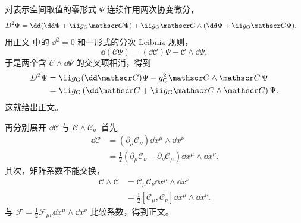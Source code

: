 \begin{derivation}
对表示空间取值的零形式 $\Psi$ 连续作用两次协变微分，
\begin{align*}
 D^2\Psi
 &=\dd(\dd\Psi+\ii g_{\rm G}\mathscr C\Psi)
 +\ii g_{\rm G}\mathscr C\wedge(\dd\Psi+\ii g_{\rm G}\mathscr C\Psi).
\end{align*}
用正文 中的 $\dd^2=0$ 和一形式的分次 Leibniz 规则，
\begin{equation*}
 \dd(\mathscr C\Psi)=(\dd\mathscr C)\Psi-\mathscr C\wedge\dd\Psi,
\end{equation*}
于是两个含 $\mathscr C\wedge\dd\Psi$ 的交叉项相消，得到
\begin{align*}
 D^2\Psi
 &=\ii g_{\rm G}(\dd\mathscr C)\Psi
 -g_{\rm G}^2\mathscr C\wedge\mathscr C\,\Psi\\
 &=\ii g_{\rm G}
 \left(\dd\mathscr C+\ii g_{\rm G}\mathscr C\wedge\mathscr C\right)\Psi.
\end{align*}
这就给出正文。

再分别展开 $\dd\mathscr C$ 与 $\mathscr C\wedge\mathscr C$。首先
\begin{align*}
 \dd\mathscr C
 &=(\partial_\mu\mathscr C_\nu)\dd x^\mu\wedge\dd x^\nu\\
 &=\frac12(\partial_\mu\mathscr C_\nu-\partial_\nu\mathscr C_\mu)
 \dd x^\mu\wedge\dd x^\nu.
\end{align*}
其次，矩阵系数不能交换，
\begin{align*}
 \mathscr C\wedge\mathscr C
 &=\mathscr C_\mu\mathscr C_\nu\dd x^\mu\wedge\dd x^\nu\\
 &=\frac12[\mathscr C_\mu,\mathscr C_\nu]\dd x^\mu\wedge\dd x^\nu.
\end{align*}
与 $\mathcal F=\tfrac12\mathcal F_{\mu\nu}\dd x^\mu\wedge\dd x^\nu$ 比较系数，得到正文。
\end{derivation}

